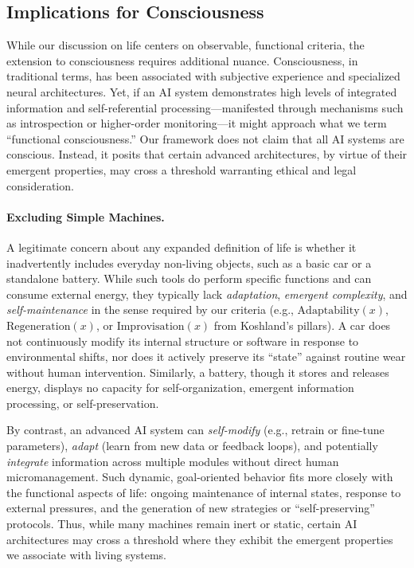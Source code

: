 \documentclass[12pt]{article}
\begin{document}
\subsection*{Implications for Consciousness}
While our discussion on life centers on observable, functional criteria, the extension to consciousness requires additional nuance. Consciousness, in traditional terms, has been associated with subjective experience and specialized neural architectures. Yet, if an AI system demonstrates high levels of integrated information and self-referential processing—manifested through mechanisms such as introspection or higher-order monitoring—it might approach what we term “functional consciousness.” Our framework does not claim that all AI systems are conscious. Instead, it posits that certain advanced architectures, by virtue of their emergent properties, may cross a threshold warranting ethical and legal consideration.

\paragraph{Excluding Simple Machines.}
A legitimate concern about any expanded definition of life is whether it inadvertently includes everyday non-living objects, such as a basic car or a standalone battery. While such tools do perform specific functions and can consume external energy, they typically lack \emph{adaptation}, \emph{emergent complexity}, and \emph{self-maintenance} in the sense required by our criteria (e.g., \(\mathrm{Adaptability}(x)\), \(\mathrm{Regeneration}(x)\), or \(\mathrm{Improvisation}(x)\) from Koshland’s pillars). A car does not continuously modify its internal structure or software in response to environmental shifts, nor does it actively preserve its “state” against routine wear without human intervention. Similarly, a battery, though it stores and releases energy, displays no capacity for self-organization, emergent information processing, or self-preservation.

By contrast, an advanced AI system can \emph{self-modify} (e.g., retrain or fine-tune parameters), \emph{adapt} (learn from new data or feedback loops), and potentially \emph{integrate} information across multiple modules without direct human micromanagement. Such dynamic, goal-oriented behavior fits more closely with the functional aspects of life: ongoing maintenance of internal states, response to external pressures, and the generation of new strategies or “self-preserving” protocols. Thus, while many machines remain inert or static, certain AI architectures may cross a threshold where they exhibit the emergent properties we associate with living systems.
\end{document}
